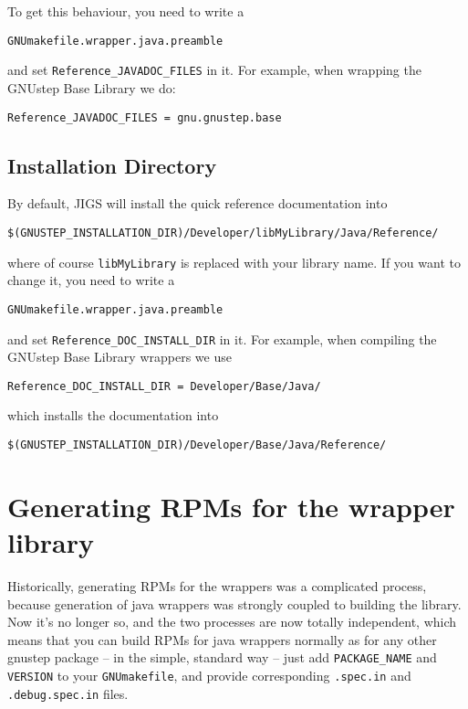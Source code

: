 To get this behaviour, you need to write a 
\begin{verbatim}
GNUmakefile.wrapper.java.preamble
\end{verbatim}
and set \texttt{Reference\_JAVADOC\_FILES} in it.  For example, when 
wrapping the GNUstep Base Library we do:
\begin{verbatim}
Reference_JAVADOC_FILES = gnu.gnustep.base
\end{verbatim}

\subsection{Installation Directory}
By default, JIGS will install the quick reference documentation into 
\begin{verbatim}
$(GNUSTEP_INSTALLATION_DIR)/Developer/libMyLibrary/Java/Reference/
\end{verbatim}%
where of course \texttt{libMyLibrary} is replaced with your library name.
If you want to change it, you need to write a 
\begin{verbatim}
GNUmakefile.wrapper.java.preamble
\end{verbatim}
and set \texttt{Reference\_DOC\_INSTALL\_DIR} in it.  For example, 
when compiling the GNUstep Base Library wrappers we use
\begin{verbatim}
Reference_DOC_INSTALL_DIR = Developer/Base/Java/
\end{verbatim}
which installs the documentation into
\begin{verbatim}
$(GNUSTEP_INSTALLATION_DIR)/Developer/Base/Java/Reference/
\end{verbatim}%

\section{Generating RPMs for the wrapper library}

Historically, generating RPMs for the wrappers was a complicated
process, because generation of java wrappers was strongly coupled to
building the library.  Now it's no longer so, and the two processes
are now totally independent, which means that you can build RPMs for
java wrappers normally as for any other gnustep package -- in the
simple, standard way -- just add \texttt{PACKAGE\_NAME} and
\texttt{VERSION} to your \texttt{GNUmakefile}, and provide
corresponding \texttt{.spec.in} and \texttt{.debug.spec.in} files.

